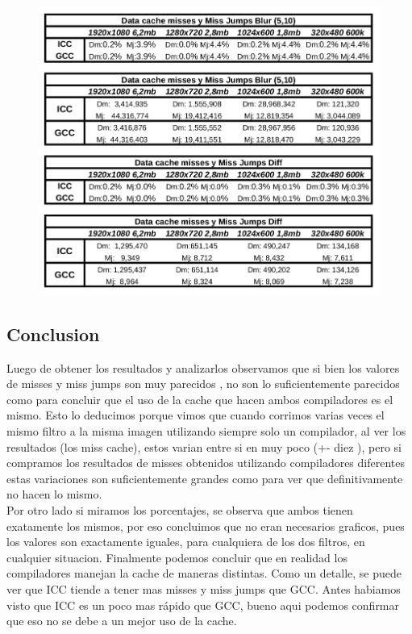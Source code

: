 \begin{figure}[H]
\begin{center}
  \includegraphics[width=\linewidth]{cachecompiladores/tabla.png}
\end{center}
\end{figure}

\subsection{Conclusion}

Luego de obtener los resultados y analizarlos observamos que si bien los valores de misses y miss jumps son muy parecidos , no son lo suficientemente parecidos como para concluir que el uso de la cache que hacen ambos compiladores es el mismo. Esto lo deducimos porque vimos que cuando corrimos varias veces el mismo filtro a la misma imagen utilizando siempre solo un compilador, al ver los resultados (los miss cache), estos varian entre si en muy poco (+- diez ), pero si compramos los resultados de misses obtenidos utilizando compiladores diferentes estas variaciones son suficientemente grandes como para ver que definitivamente no hacen lo mismo. \\

Por otro lado si miramos los porcentajes, se observa que ambos tienen exatamente los mismos, por eso concluimos que no eran necesarios graficos, pues los valores son exactamente iguales, para cualquiera de los dos filtros, en cualquier situacion. Finalmente podemos concluir que en realidad los compiladores manejan la cache de maneras distintas. Como un detalle, se puede ver que ICC tiende a tener mas misses y miss jumps que GCC. Antes habiamos visto que ICC es un poco mas rápido que GCC, bueno aqui podemos confirmar que eso no se debe a un mejor uso de la cache.